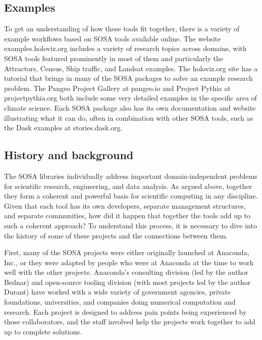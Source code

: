 \subsection{Examples}

To get an understanding of how these tools fit together, there is a variety of example workflows based on SOSA tools available online. The website examples.holoviz.org includes a variety of research topics across domains, with SOSA tools featured prominently in most of them and particularly the Attractors, Census, Ship traffic, and Landsat examples. The holoviz.org site has a tutorial that brings in many of the SOSA packages to solve an example research problem. The Pangeo Project Gallery at pangeo.io and Project Pythia at projectpythia.org both include some very detailed examples in the specific area of climate science. Each SOSA package also has its own documentation and website illustrating what it can do, often in combination with other SOSA tools, such as the Dask examples at stories.dask.org.

\subsection{History and background}

The SOSA libraries individually address important domain-independent problems for scientific research, engineering, and data analysis. As argued above, together they form a coherent and powerful basis for scientific computing in any discipline. Given that each tool has its own developers, separate management structures, and separate communities, how did it happen that together the tools add up to such a coherent approach? To understand this process, it is necessary to dive into the history of some of these projects and the connections between them.

First, many of the SOSA projects were either originally launched at Anaconda, Inc., or they were adapted by people who were at Anaconda at the time to work well with the other projects. Anaconda's consulting division (led by the author Bednar) and open-source tooling division (with most projects led by the author Durant) have worked with a wide variety of government agencies, private foundations, universities, and companies doing numerical computation and research. Each project is designed to address pain points being experienced by those collaborators, and the staff involved help the projects work together to add up to complete solutions.

